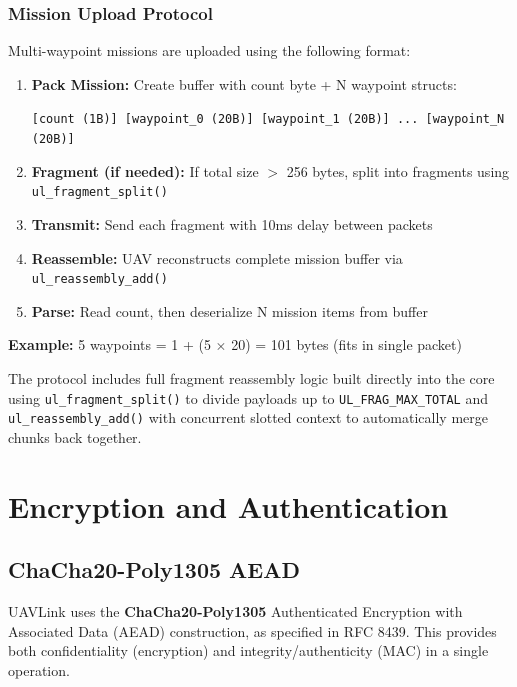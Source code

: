 \documentclass[11pt,a4paper]{article}
\begin{document}
\subsubsection{Mission Upload Protocol}

Multi-waypoint missions are uploaded using the following format:

\begin{enumerate}[noitemsep]
    \item \textbf{Pack Mission:} Create buffer with count byte + N waypoint structs:
    \begin{center}
    \texttt{[count (1B)] [waypoint\_0 (20B)] [waypoint\_1 (20B)] ... [waypoint\_N (20B)]}
    \end{center}
    \item \textbf{Fragment (if needed):} If total size $>$ 256 bytes, split into fragments using \texttt{ul\_fragment\_split()}
    \item \textbf{Transmit:} Send each fragment with 10ms delay between packets
    \item \textbf{Reassemble:} UAV reconstructs complete mission buffer via \texttt{ul\_reassembly\_add()}
    \item \textbf{Parse:} Read count, then deserialize N mission items from buffer
\end{enumerate}

\textbf{Example:} 5 waypoints = 1 + (5 $\times$ 20) = 101 bytes (fits in single packet)

\begin{notebox}
The protocol includes full fragment reassembly logic built directly into the core using \texttt{ul\_fragment\_split()} to divide payloads up to \texttt{UL\_FRAG\_MAX\_TOTAL} and \texttt{ul\_reassembly\_add()} with concurrent slotted context to automatically merge chunks back together.
\end{notebox}

\section{Encryption and Authentication}

\subsection{ChaCha20-Poly1305 AEAD}

UAVLink uses the \textbf{ChaCha20-Poly1305} Authenticated Encryption with Associated Data (AEAD) construction, as specified in RFC 8439. This provides both confidentiality (encryption) and integrity/authenticity (MAC) in a single operation.
\end{document}
